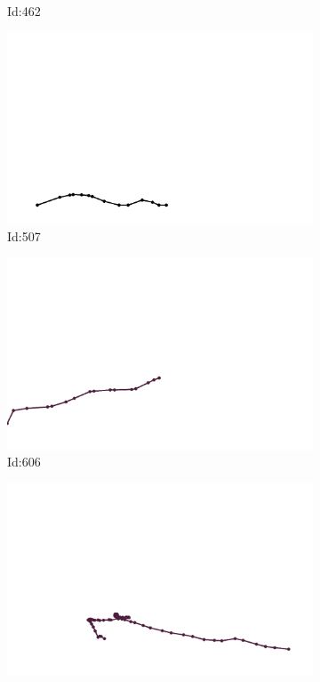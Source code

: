\documentclass[12pt,twoside]{report}
\begin{document}
\begin{figure}
\begin{subfigure}[b]{0.20\textwidth}
\caption{Id:462}
\end{subfigure}
\begin{subfigure}[b]{0.20\textwidth}
\centering
\includegraphics[width=\textwidth]{../trajectories/507.png}
\caption{Id:507}
\end{subfigure}
\begin{subfigure}[b]{0.20\textwidth}
\centering
\includegraphics[width=\textwidth]{../trajectories/606.png}
\caption{Id:606}
\end{subfigure}
\begin{subfigure}[b]{0.20\textwidth}
\centering
\includegraphics[width=\textwidth]{../trajectories/620.png}

\end{subfigure}
\end{figure}
\end{document}

